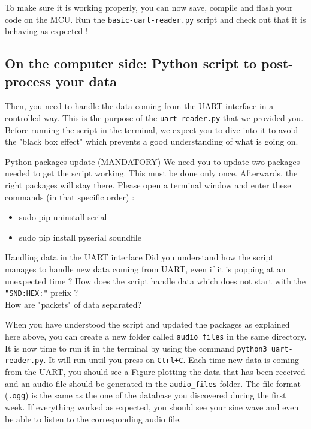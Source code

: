 \noindent To make sure it is working properly, you can now save, compile and flash your code on the MCU. Run the \texttt{basic-uart-reader.py} script and check out that it is behaving as expected !

\subsection*{On the computer side: Python script to post-process your data}

Then, you need to handle the data coming from the UART interface in a controlled way. This is the purpose of the \texttt{uart-reader.py} that we provided you. Before running the script in the terminal, we expect you to dive into it to avoid the "black box effect" which prevents a good understanding of what is going on.

\begin{bclogo}[couleur = gray!20, arrondi = 0.2, logo=\bcattention]{Python packages update (MANDATORY)}
We need you to update two packages needed to get the script working. This must be done only once. Afterwards, the right packages will stay there. Please open a terminal window and enter these commands (in that specific order) :

\begin{itemize}
    \item sudo pip uninstall serial
    \item sudo pip install pyserial soundfile
\end{itemize}

\end{bclogo}

\begin{bclogo}[couleur = gray!20, arrondi = 0.2, logo=\bcquestion]{Handling data in the UART interface}
Did you understand how the script manages to handle new data coming from UART, even if it is popping at an unexpected time ? How does the script handle data which does not start with the \texttt{"SND:HEX:"} prefix ? \\

\noindent How are "packets" of data separated?
\end{bclogo}

\noindent When you have understood the script and updated the packages as explained here above, you can create a new folder called \texttt{audio\_files} in the same directory. It is now time to run it in the terminal by using the command \texttt{python3 uart-reader.py}. It will run until you press on \texttt{Ctrl+C}. Each time new data is coming from the UART, you should see a Figure plotting the data that has been received and an audio file should be generated in the \texttt{audio\_files} folder. The file format (\texttt{.ogg}) is the same as the one of the database you discovered during the first week. If everything worked as expected, you should see your sine wave and even be able to listen to the corresponding audio file.

